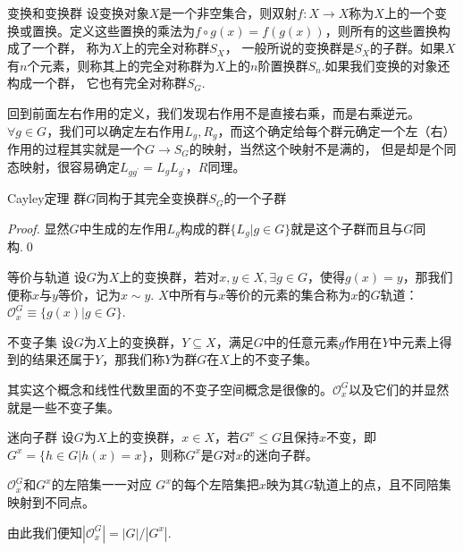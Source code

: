 \begin{define}{变换和变换群}
    设变换对象$X$是一个非空集合，则双射$f:X\rightarrow X$称为$X$上的一个变换或置换。定义这些置换的乘法为$f\circ g(x)=f(g(x))$，则所有的这些置换构成了一个群，
    称为$X$上的完全对称群$S_X$， 一般所说的变换群是$S_X$的子群。如果$X$有$n$个元素，则称其上的完全对称群为$X$上的$n$阶置换群$S_n$.如果我们变换的对象还构成一个群，
    它也有完全对称群$S_G$.
\end{define}

回到前面左右作用的定义，我们发现右作用不是直接右乘，而是右乘逆元。$\forall g\in G$，我们可以确定左右作用$L_g,R_g$，而这个确定给每个群元确定一个左（右）作用的过程其实就是一个$G\to S_G$的映射，当然这个映射不是满的，
但是却是个同态映射，很容易确定$L_{gg^\prime}=L_gL_{g^\prime}$，$R$同理。
\begin{theorem}{Cayley定理}
    群$G$同构于其完全变换群$S_G$的一个子群
\end{theorem}
\begin{proof}
    显然$G$中生成的左作用$L_g$构成的群$\{L_g|g\in G\}$就是这个子群而且与$G$同构.\qed
\end{proof}
\begin{define}{等价与轨道}
    设$G$为$X$上的变换群，若对$x,y\in X,\exists g\in G$，使得$g(x)=y$，那我们便称$x$与$y$等价，记为$x\sim y$. $X$中所有与$x$等价的元素的集合称为$x$的$G$轨道：
    $\mathcal{O}_x^G\equiv\{g(x)|g\in G\}$.
\end{define}
\begin{define}{不变子集}
    设$G$为$X$上的变换群，$Y\subseteq X$，满足$G$中的任意元素$g$作用在$Y$中元素上得到的结果还属于$Y$，那我们称$Y$为群$G$在$X$上的不变子集。
\end{define}
其实这个概念和线性代数里面的不变子空间概念是很像的。$\mathcal{O}_x^G$以及它们的并显然就是一些不变子集。
\begin{define}{迷向子群}
    设$G$为$X$上的变换群，$x\in X$，若$G^{x}\leq G$且保持$x$不变，即$G^{x}=\{h\in G|h(x)=x\}$，则称$G^{x}$是$G$对$x$的迷向子群。
\end{define}
\begin{define}{$\mathcal{O}_x^G$和$G^{x}$的左陪集一一对应}
    $G^{x}$的每个左陪集把$x$映为其$G$轨道上的点，且不同陪集映射到不同点。
\end{define}
由此我们便知$|\mathcal{O}_x^G|=|G|/|G^{x}|$.
